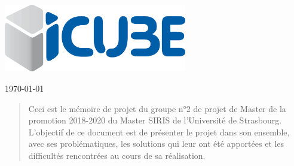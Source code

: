 \documentclass{memoire}
\begin{document}
\begin{center}
  \medskip

  \includegraphics[width=8cm]{logos/icube.png}

  {
  \begin{otherlanguage}{french}
    \small \today
  \end{otherlanguage}
  }
\end{center}

\cleardoublepage


\tableofcontents

{
  \listoffigures
  \listoftables
}

\cleardoublepage

\begin{abstract}
Ceci est le mémoire de projet du groupe n°2 de projet de Master de la promotion 2018-2020 du Master SIRIS de l'Université de Strasbourg.
\newline
L'objectif de ce document est de présenter le projet dans son ensemble, avec ses problématiques, les solutions qui leur ont été apportées et les difficultés rencontrées au cours de sa réalisation.
\end{abstract}















\clearpage



\end{document}
